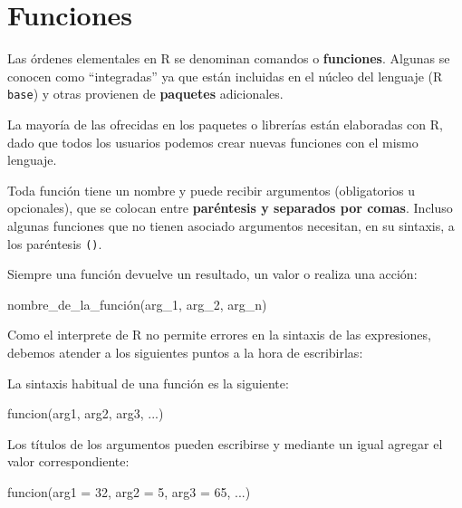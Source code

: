 \documentclass[
  spanish,
  letterpaper,
  DIV=11,
  numbers=noendperiod]{scrreprt}
\newenvironment{Shaded}{\begin{snugshade}}{\end{snugshade}}
\newcommand{\AttributeTok}[1]{\textcolor[rgb]{0.40,0.45,0.13}{#1}}
\newcommand{\DecValTok}[1]{\textcolor[rgb]{0.68,0.00,0.00}{#1}}
\newcommand{\FunctionTok}[1]{\textcolor[rgb]{0.28,0.35,0.67}{#1}}
\newcommand{\NormalTok}[1]{\textcolor[rgb]{0.00,0.23,0.31}{#1}}
\begin{document}
\section{Funciones}\label{funciones}

Las órdenes elementales en R se denominan comandos o \textbf{funciones}.
Algunas se conocen como ``integradas'' ya que están incluidas en el
núcleo del lenguaje (R \texttt{base}) y otras provienen de
\textbf{paquetes} adicionales.

La mayoría de las ofrecidas en los paquetes o librerías están elaboradas
con R, dado que todos los usuarios podemos crear nuevas funciones con el
mismo lenguaje.

Toda función tiene un nombre y puede recibir argumentos (obligatorios u
opcionales), que se colocan entre \textbf{paréntesis y separados por
comas}. Incluso algunas funciones que no tienen asociado argumentos
necesitan, en su sintaxis, a los paréntesis \texttt{()}.

Siempre una función devuelve un resultado, un valor o realiza una
acción:

\begin{Shaded}
\begin{Highlighting}[]
\NormalTok{nombre\_de\_la\_función(arg\_1, arg\_2, arg\_n)}
\end{Highlighting}
\end{Shaded}

Como el interprete de R no permite errores en la sintaxis de las
expresiones, debemos atender a los siguientes puntos a la hora de
escribirlas:

La sintaxis habitual de una función es la siguiente:

\begin{Shaded}
\begin{Highlighting}[]
\FunctionTok{funcion}\NormalTok{(arg1, arg2, arg3, ...)}
\end{Highlighting}
\end{Shaded}

Los títulos de los argumentos pueden escribirse y mediante un igual
agregar el valor correspondiente:

\begin{Shaded}
\begin{Highlighting}[]
\FunctionTok{funcion}\NormalTok{(}\AttributeTok{arg1 =} \DecValTok{32}\NormalTok{, }\AttributeTok{arg2 =} \DecValTok{5}\NormalTok{, }\AttributeTok{arg3 =} \DecValTok{65}\NormalTok{, ...)}
\end{Highlighting}
\end{Shaded}
\end{document}
